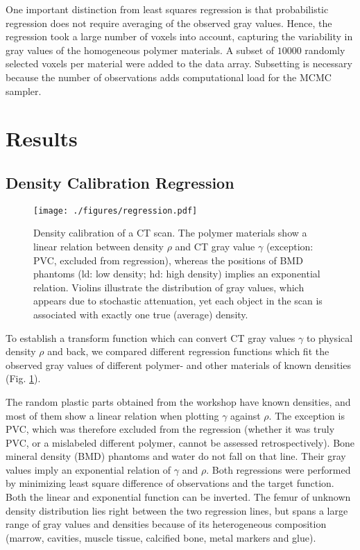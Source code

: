 One important distinction from least squares regression is that probabilistic regression does not require averaging of the observed gray values.
Hence, the regression took a large number of voxels into account, capturing the variability in gray values of the homogeneous polymer materials.
A subset of \(10000\) randomly selected voxels per material were added to the data array.
Subsetting is necessary because the number of observations adds computational load for the MCMC sampler.


\section{Results}
\label{sec:org702ccb3}
\subsection{Density Calibration Regression}
\label{sec:org184df92}
\begin{figure}[htbp]
\centering
\texttt{[image: ./figures/regression.pdf]}
\caption{\label{fig:density_calibration}Density calibration of a CT scan. The polymer materials show a linear relation between density \(\rho\) and CT gray value \(\gamma\) (exception: PVC, excluded from regression), whereas the positions of BMD phantoms (ld: low density; hd: high density) implies an exponential relation. Violins illustrate the distribution of gray values, which appears due to stochastic attenuation, yet each object in the scan is associated with exactly one true (average) density.}
\end{figure}

To establish a transform function which can convert CT gray values \(\gamma\) to physical density \(\rho\) and back, we compared different regression functions which fit the observed gray values of different polymer- and other materials of known densities (Fig. \ref{fig:density_calibration}).

The random plastic parts obtained from the workshop have known densities, and most of them show a linear relation when plotting \(\gamma\) against \(\rho\).
The exception is PVC, which was therefore excluded from the regression (whether it was truly PVC, or a mislabeled different polymer, cannot be assessed retrospectively).
Bone mineral density (BMD) phantoms and water do not fall on that line.
Their gray values imply an exponential relation of \(\gamma\) and \(\rho\).
Both regressions were performed by minimizing least square difference of observations and the target function.
Both the linear and exponential function can be inverted.
The femur of unknown density distribution lies right between the two regression lines, but spans a large range of gray values and densities because of its heterogeneous composition (marrow, cavities, muscle tissue, calcified bone, metal markers and glue).

